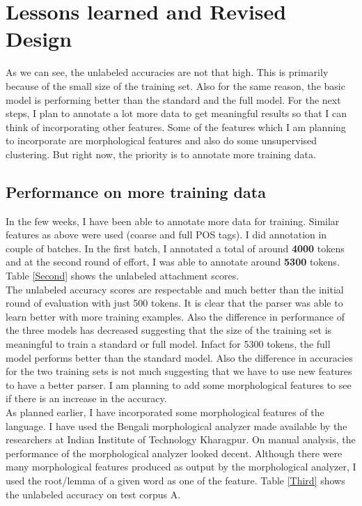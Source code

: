 \documentclass[11pt,letterpaper]{article}
\begin{document}
\section{Lessons learned and Revised Design}
As we can see, the unlabeled accuracies are not that high. This is primarily because of the small size of the training set. Also for the same reason, the basic model is performing better than the standard and the full model. For the next steps, I plan to annotate a lot more data to get meaningful results so that I can think of incorporating other features. Some of the features which I am planning to incorporate are morphological features and also do some unsupervised clustering. But right now, the priority is to annotate more training data.

\subsection{Performance on more training data}
In the few weeks, I have been able to annotate more data for training. Similar features as above were used (coarse and full POS tags). I did annotation in couple of batches. In the first batch, I annotated a total of around \textbf{4000} tokens and at the second round of effort, I was able to annotate around \textbf{5300} tokens. Table \ref{Second} shows the unlabeled attachment scores. \\

The unlabeled accuracy scores are respectable and much better than the initial round of evaluation with just 500 tokens. It is clear that the parser was able to learn better with more training examples. Also the difference in performance of the three models has decreased suggesting that the size of the training set is meaningful to train a standard or full model. Infact for 5300 tokens, the full model performs better than the standard model. Also the difference in accuracies for the two training sets is not much suggesting that we have to use new features to have a better parser. I am planning to add some morphological features to see if there is an increase in the accuracy.\\

As planned earlier, I have incorporated some morphological features of the language. I have used the Bengali morphological analyzer \citep{BMA} made available by the researchers at Indian Institute of Technology Kharagpur. On manual analysis, the performance of the morphological analyzer looked decent. Although there were many morphological features produced as output by the morphological analyzer, I used the root/lemma of a given word as one of the feature. Table \ref{Third} shows the unlabeled accuracy on test corpus A. \\
\end{document}

